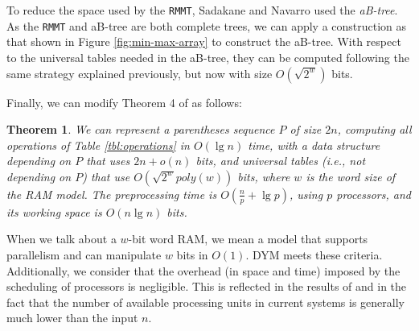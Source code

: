 To reduce the space used by the {\tt RMMT}, Sadakane and Nava\-rro used
the \emph{aB-tree}. As the {\tt RMMT} and aB-tree are both complete trees, we can apply a
construction as that shown in Figure \ref{fig:min-max-array} to
construct the aB-tree. With respect to the universal tables needed in
the aB-tree, they can be computed following the same strategy
explained previously, but now with size $O(\sqrt{2^{w}})$
bits.

Finally, we can modify Theorem 4 of
\cite{Navarro:2014:FFS:2620785.2601073} as follows:

\newtheorem{theorem}{Theorem}
\begin{theorem}
  We can represent a parentheses sequence $P$ of size $2n$, computing all
  operations of Table \ref{tbl:operations}
  in $O(\lg n)$ time, with a data
  structure depending on $P$ that uses $2n+o(n)$ bits, and universal
  tables (i.e., not depending on $P$) that use $O(\sqrt{2^{w}}poly(w))$
  bits, where $w$ is the word size of the RAM model. The preprocessing
  time is $O(\frac{n}{p} + \lg p)$, using $p$
  processors, and its working space is $O(n\lg n)$ bits.
\end{theorem}
			
When we talk about a $w$-bit word RAM, we mean a model that supports
parallelism and can manipulate $w$ bits in $O(1)$. DYM meets these
criteria. Additionally, we consider that the overhead (in space and
time) imposed by the scheduling of processors is negligible. This is
reflected in the results of \cite{Blumofe:1999:SMC:324133.324234} and in the fact that the number of available processing units in current systems is generally much lower than the input $n$.
